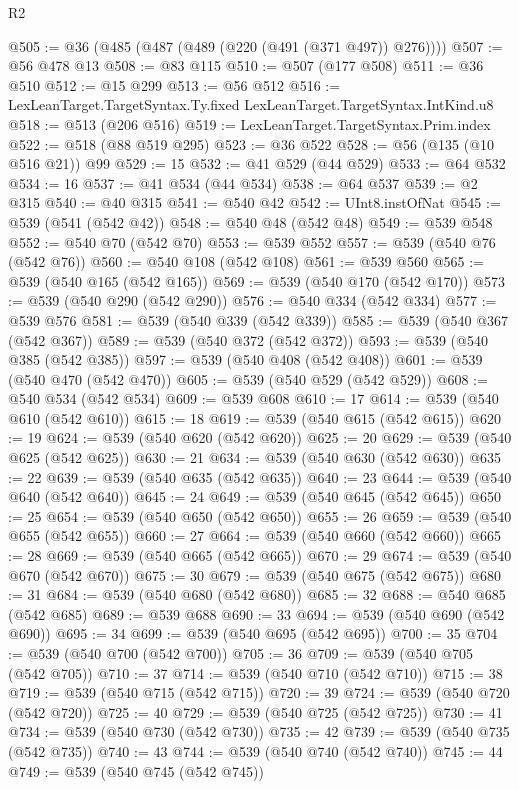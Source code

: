 \begin{lexlean}{R2}
\begin{coremodule}
@505 := @36 (@485 (@487 (@489 (@220 (@491 (@371 @497)) @276))))
@507 := @56 @478 @13
@508 := @83 @115
@510 := @507 (@177 @508)
@511 := @36 @510
@512 := @15 @299
@513 := @56 @512
@516 := LexLeanTarget.TargetSyntax.Ty.fixed LexLeanTarget.TargetSyntax.IntKind.u8
@518 := @513 (@206 @516)
@519 := LexLeanTarget.TargetSyntax.Prim.index
@522 := @518 (@88 @519 @295)
@523 := @36 @522
@528 := @56 (@135 (@10 @516 @21)) @99
@529 := 15
@532 := @41 @529 (@44 @529)
@533 := @64 @532
@534 := 16
@537 := @41 @534 (@44 @534)
@538 := @64 @537
@539 := @2 @315
@540 := @40 @315
@541 := @540 @42
@542 := UInt8.instOfNat
@545 := @539 (@541 (@542 @42))
@548 := @540 @48 (@542 @48)
@549 := @539 @548
@552 := @540 @70 (@542 @70)
@553 := @539 @552
@557 := @539 (@540 @76 (@542 @76))
@560 := @540 @108 (@542 @108)
@561 := @539 @560
@565 := @539 (@540 @165 (@542 @165))
@569 := @539 (@540 @170 (@542 @170))
@573 := @539 (@540 @290 (@542 @290))
@576 := @540 @334 (@542 @334)
@577 := @539 @576
@581 := @539 (@540 @339 (@542 @339))
@585 := @539 (@540 @367 (@542 @367))
@589 := @539 (@540 @372 (@542 @372))
@593 := @539 (@540 @385 (@542 @385))
@597 := @539 (@540 @408 (@542 @408))
@601 := @539 (@540 @470 (@542 @470))
@605 := @539 (@540 @529 (@542 @529))
@608 := @540 @534 (@542 @534)
@609 := @539 @608
@610 := 17
@614 := @539 (@540 @610 (@542 @610))
@615 := 18
@619 := @539 (@540 @615 (@542 @615))
@620 := 19
@624 := @539 (@540 @620 (@542 @620))
@625 := 20
@629 := @539 (@540 @625 (@542 @625))
@630 := 21
@634 := @539 (@540 @630 (@542 @630))
@635 := 22
@639 := @539 (@540 @635 (@542 @635))
@640 := 23
@644 := @539 (@540 @640 (@542 @640))
@645 := 24
@649 := @539 (@540 @645 (@542 @645))
@650 := 25
@654 := @539 (@540 @650 (@542 @650))
@655 := 26
@659 := @539 (@540 @655 (@542 @655))
@660 := 27
@664 := @539 (@540 @660 (@542 @660))
@665 := 28
@669 := @539 (@540 @665 (@542 @665))
@670 := 29
@674 := @539 (@540 @670 (@542 @670))
@675 := 30
@679 := @539 (@540 @675 (@542 @675))
@680 := 31
@684 := @539 (@540 @680 (@542 @680))
@685 := 32
@688 := @540 @685 (@542 @685)
@689 := @539 @688
@690 := 33
@694 := @539 (@540 @690 (@542 @690))
@695 := 34
@699 := @539 (@540 @695 (@542 @695))
@700 := 35
@704 := @539 (@540 @700 (@542 @700))
@705 := 36
@709 := @539 (@540 @705 (@542 @705))
@710 := 37
@714 := @539 (@540 @710 (@542 @710))
@715 := 38
@719 := @539 (@540 @715 (@542 @715))
@720 := 39
@724 := @539 (@540 @720 (@542 @720))
@725 := 40
@729 := @539 (@540 @725 (@542 @725))
@730 := 41
@734 := @539 (@540 @730 (@542 @730))
@735 := 42
@739 := @539 (@540 @735 (@542 @735))
@740 := 43
@744 := @539 (@540 @740 (@542 @740))
@745 := 44
@749 := @539 (@540 @745 (@542 @745))

\end{coremodule}
\end{lexlean}
